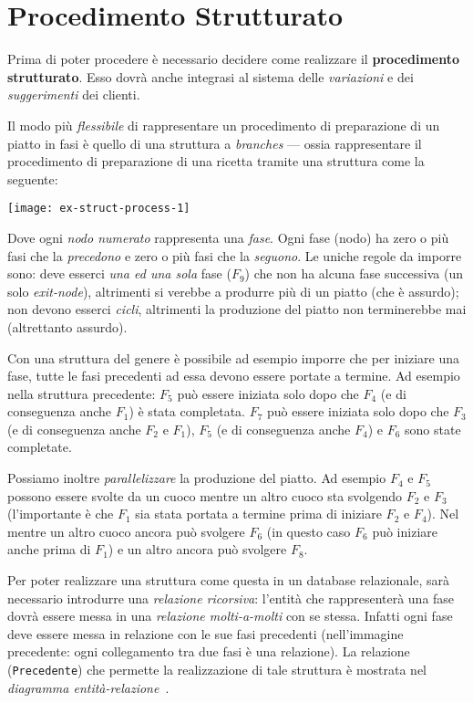 \section{Procedimento Strutturato}\label{sec:structuredprocess}
Prima di poter procedere è necessario decidere come realizzare il {\bf procedimento strutturato}.
Esso dovrà anche integrasi al sistema delle {\it variazioni} e dei {\it suggerimenti} dei clienti.

Il modo più {\it flessibile} di rappresentare un procedimento di preparazione di un piatto
in fasi è quello di una struttura a {\it branches} --- ossia rappresentare il procedimento
di preparazione di una ricetta tramite una struttura come la seguente:

\vspace{5pt}\centerline{\texttt{[image: ex-struct-process-1]}}

\vspace{15pt}

Dove ogni {\it nodo numerato} rappresenta una {\it fase}. Ogni fase (nodo) ha zero o più fasi
che la {\it precedono} e zero o più fasi che la {\it seguono}. Le uniche regole da imporre
sono: deve esserci {\it una ed una sola} fase ($F_{9}$) che non ha alcuna fase successiva (un
solo {\it exit-node}), altrimenti si verebbe a produrre più di un piatto (che è assurdo); non
devono esserci {\it cicli}, altrimenti la produzione del piatto non terminerebbe mai (altrettanto assurdo).

Con una struttura del genere è possibile ad esempio imporre che per iniziare una fase,
tutte le fasi precedenti ad essa devono essere portate a termine. Ad esempio nella struttura precedente:
$F_{5}$ può essere iniziata solo dopo che $F_{4}$ (e di conseguenza anche $F_{1}$) è stata completata.
$F_{7}$ può essere iniziata solo dopo che $F_{3}$ (e di conseguenza anche $F_{2}$ e $F_{1}$),
$F_{5}$ (e di conseguenza anche $F_{4}$) e $F_{6}$ sono state completate.

Possiamo inoltre {\it parallelizzare} la produzione del piatto. Ad esempio $F_{4}$ e $F_{5}$ possono essere
svolte da un cuoco mentre un altro cuoco sta svolgendo $F_{2}$ e $F_{3}$ (l'importante è che
$F_{1}$ sia stata portata a termine prima di iniziare $F_{2}$ e $F_{4}$). Nel mentre un altro
cuoco ancora può svolgere $F_{6}$ (in questo caso $F_{6}$ può iniziare anche prima di $F_{1}$)
e un altro ancora può svolgere $F_{8}$.

Per poter realizzare una struttura come questa in un database relazionale, sarà necessario
introdurre una {\it relazione ricorsiva}: l'entità che rappresenterà una fase dovrà essere
messa in una {\it relazione molti-a-molti} con se stessa. Infatti ogni fase deve essere
messa in relazione con le sue fasi precedenti (nell'immagine precedente: ogni collegamento
tra due fasi è una relazione).
La relazione ({\tt Precedente}) che permette la realizzazione di tale struttura è mostrata
nel {\it diagramma entità-relazione}~.

%
